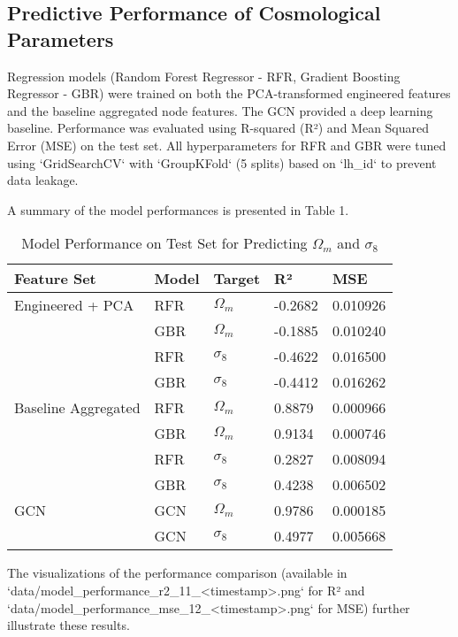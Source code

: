 \documentclass[twocolumn]{aastex631}
\begin{document}
\subsection{Predictive Performance of Cosmological Parameters}

Regression models (Random Forest Regressor - RFR, Gradient Boosting Regressor - GBR) were trained on both the PCA-transformed engineered features and the baseline aggregated node features. The GCN provided a deep learning baseline. Performance was evaluated using R-squared (R²) and Mean Squared Error (MSE) on the test set. All hyperparameters for RFR and GBR were tuned using `GridSearchCV` with `GroupKFold` (5 splits) based on `lh_id` to prevent data leakage.

A summary of the model performances is presented in Table 1.

\begin{table}[h!]
\centering
\caption{Model Performance on Test Set for Predicting $\Omega_m$ and $\sigma_8$}
\begin{tabular}{|l|l|l|l|l|}
\hline
Feature Set             & Model & Target    & R²      & MSE        \\ \hline
Engineered + PCA    & RFR   & $\Omega_m$  & -0.2682 & 0.010926   \\ \hline
                        & GBR   & $\Omega_m$  & -0.1885 & 0.010240   \\ \hline
                        & RFR   & $\sigma_8$  & -0.4622 & 0.016500   \\ \hline
                        & GBR   & $\sigma_8$  & -0.4412 & 0.016262   \\ \hline
Baseline Aggregated & RFR   & $\Omega_m$  & 0.8879  & 0.000966   \\ \hline
                        & GBR   & $\Omega_m$  & 0.9134  & 0.000746   \\ \hline
                        & RFR   & $\sigma_8$  & 0.2827  & 0.008094   \\ \hline
                        & GBR   & $\sigma_8$  & 0.4238  & 0.006502   \\ \hline
GCN                     & GCN   & $\Omega_m$  & 0.9786  & 0.000185   \\ \hline
                        & GCN   & $\sigma_8$  & 0.4977  & 0.005668   \\ \hline
\end{tabular}
\label{tab:model_performance}
\end{table}

The visualizations of the performance comparison (available in `data/model_performance_r2_11_<timestamp>.png` for R² and `data/model_performance_mse_12_<timestamp>.png` for MSE) further illustrate these results.
\end{document}
